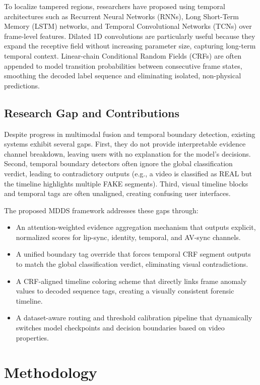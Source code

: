 \documentclass[journal,10pt,onecolumn,draftclsnofoot]{IEEEtran}
\begin{document}
To localize tampered regions, researchers have proposed using temporal architectures such as Recurrent Neural Networks (RNNs), Long Short-Term Memory (LSTM) networks, and Temporal Convolutional Networks (TCNs) over frame-level features. Dilated 1D convolutions are particularly useful because they expand the receptive field without increasing parameter size, capturing long-term temporal context. Linear-chain Conditional Random Fields (CRFs) are often appended to model transition probabilities between consecutive frame states, smoothing the decoded label sequence and eliminating isolated, non-physical predictions.

\subsection{Research Gap and Contributions}
Despite progress in multimodal fusion and temporal boundary detection, existing systems exhibit several gaps. First, they do not provide interpretable evidence channel breakdown, leaving users with no explanation for the model's decisions. Second, temporal boundary detectors often ignore the global classification verdict, leading to contradictory outputs (e.g., a video is classified as REAL but the timeline highlights multiple FAKE segments). Third, visual timeline blocks and temporal tags are often unaligned, creating confusing user interfaces. 

The proposed MDDS framework addresses these gaps through:
\begin{itemize}
    \item An attention-weighted evidence aggregation mechanism that outputs explicit, normalized scores for lip-sync, identity, temporal, and AV-sync channels.
    \item A unified boundary tag override that forces temporal CRF segment outputs to match the global classification verdict, eliminating visual contradictions.
    \item A CRF-aligned timeline coloring scheme that directly links frame anomaly values to decoded sequence tags, creating a visually consistent forensic timeline.
    \item A dataset-aware routing and threshold calibration pipeline that dynamically switches model checkpoints and decision boundaries based on video properties.
\end{itemize}

\section{Methodology}
\end{document}
